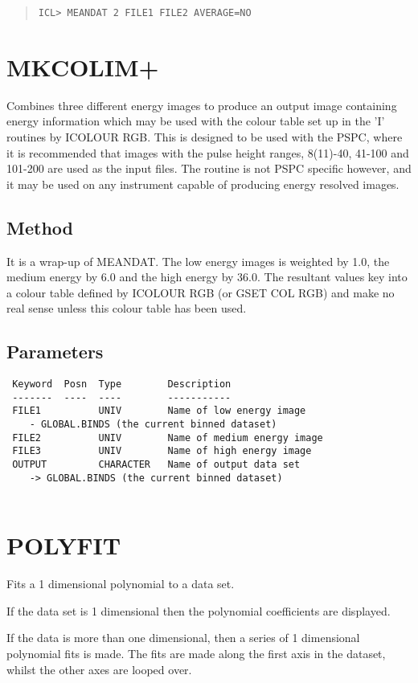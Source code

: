 \documentclass{book}
\renewcommand{\_}{{\tt\char'137}}     %
\begin{document}
\begin{quote}\begin{verbatim}
ICL> MEANDAT 2 FILE1 FILE2 AVERAGE=NO
\end{verbatim}\end{quote}
\section{MKCOLIM+}
Combines three different energy images to produce an output image
containing energy information which may be used with the colour
table set up in the 'I' routines by ICOLOUR RGB. This is designed to
be used with the PSPC, where it is recommended that images with the
pulse height ranges, 8(11)-40, 41-100 and 101-200 are used as the
input files. The routine is not PSPC specific however, and it may
be used on any instrument capable of producing energy resolved images.
 
\subsection{Method}
It is a wrap-up of MEANDAT. The low energy images is weighted by 1.0,
the medium energy by 6.0 and the high energy by 36.0. The resultant
values key into a colour table defined by ICOLOUR RGB (or GSET COL RGB)
and make no real sense unless this colour table has been used.
 
\subsection{Parameters}
\begin{verbatim}
 Keyword  Posn  Type        Description
 -------  ----  ----        -----------
 FILE1          UNIV        Name of low energy image
    - GLOBAL.BINDS (the current binned dataset)
 FILE2          UNIV        Name of medium energy image
 FILE3          UNIV        Name of high energy image
 OUTPUT         CHARACTER   Name of output data set
    -> GLOBAL.BINDS (the current binned dataset)
 
\end{verbatim}\section{POLYFIT}
Fits a 1 dimensional polynomial to a data set.
 
If the data set is 1 dimensional then the polynomial coefficients
are displayed.
 
If the data is more than one dimensional, then a series of 1
dimensional polynomial fits is made. The fits are made along the
first axis in the dataset, whilst the other axes are looped over.
 
\end{document}
